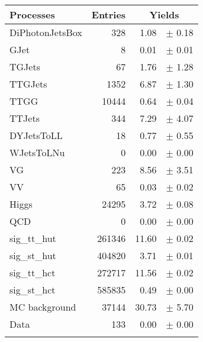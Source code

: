 {\renewcommand{\arraystretch}{1.0}
\begin{center}
\begin{tabular}{lrrl}
\hline\hline
Processes & Entries &\multicolumn{2}{c}{Yields}\\
\hline\hline
DiPhotonJetsBox  & 	             328 & 	            1.08 & $\pm$ 	       0.18\\
GJet		 & 	               8 & 	            0.01 & $\pm$ 	       0.01\\
TGJets		 & 	              67 & 	            1.76 & $\pm$ 	       1.28\\
TTGJets		 & 	            1352 & 	            6.87 & $\pm$ 	       1.30\\
TTGG		 & 	           10444 & 	            0.64 & $\pm$ 	       0.04\\
TTJets		 & 	             344 & 	            7.29 & $\pm$ 	       4.07\\
DYJetsToLL	 & 	              18 & 	            0.77 & $\pm$ 	       0.55\\
WJetsToLNu	 & 	               0 & 	            0.00 & $\pm$ 	       0.00\\
VG		 & 	             223 & 	            8.56 & $\pm$ 	       3.51\\
VV		 & 	              65 & 	            0.03 & $\pm$ 	       0.02\\
Higgs		 & 	           24295 & 	            3.72 & $\pm$ 	       0.08\\
QCD		 & 	               0 & 	            0.00 & $\pm$ 	       0.00\\
sig\_tt\_hut	 & 	          261346 & 	           11.60 & $\pm$ 	       0.02\\
sig\_st\_hut	 & 	          404820 & 	            3.71 & $\pm$ 	       0.01\\
sig\_tt\_hct	 & 	          272717 & 	           11.56 & $\pm$ 	       0.02\\
sig\_st\_hct	 & 	          585835 & 	            0.49 & $\pm$ 	       0.00\\
\hline
MC background	 & 	           37144 & 	           30.73 & $\pm$ 	       5.70\\
Data		 & 	             133 & 	            0.00 & $\pm$ 	       0.00\\
\hline\hline\\
\end{tabular}
\end{center}
}
